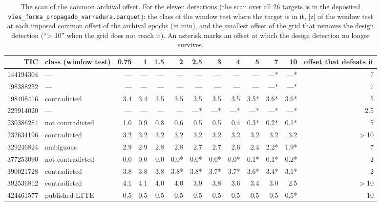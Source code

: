\documentclass{aa}
\begin{document}
\begin{table}
\caption{The scan of the common archival offset. For the eleven detections (the scan over all 26 targets is in the deposited \texttt{vies\_\allowbreak forma\_\allowbreak propagado\_\allowbreak varredura.parquet}): the class of the window test where the target is in it, |z| of the window test at each imposed common offset of the archival epochs (in min), and the smallest offset of the grid that removes the design detection (``> 10'' when the grid does not reach it). An asterisk marks an offset at which the design detection no longer survives.}
\label{t:varredura}
\centering
\scriptsize
\begin{tabular}{r l r r r r r r r r r r r}
\hline\hline
TIC & class (window test) & 0.75 & 1 & 1.5 & 2 & 2.5 & 3 & 4 & 5 & 7 & 10 & offset that defeats it\\
\hline
144194304 & --- & --- & --- & --- & --- & --- & --- & --- & --- & ---* & ---* & 7\\
198388252 & --- & --- & --- & --- & --- & --- & --- & --- & --- & ---* & ---* & 7\\
198408416 & contradicted & 3.4 & 3.4 & 3.5 & 3.5 & 3.5 & 3.5 & 3.5 & 3.5* & 3.6* & 3.6* & 5\\
229914020 & --- & --- & --- & --- & --- & ---* & ---* & ---* & ---* & ---* & ---* & 2.5\\
230386284 & not contradicted & 1.0 & 0.9 & 0.8 & 0.6 & 0.5 & 0.5 & 0.4 & 0.3* & 0.2* & 0.1* & 5\\
232634196 & contradicted & 3.2 & 3.2 & 3.2 & 3.2 & 3.2 & 3.2 & 3.2 & 3.2 & 3.2 & 3.2 & > 10\\
329246824 & ambiguous & 2.9 & 2.9 & 2.8 & 2.8 & 2.7 & 2.7 & 2.6 & 2.4 & 2.2* & 1.9* & 7\\
377253090 & not contradicted & 0.0 & 0.0 & 0.0 & 0.0* & 0.0* & 0.0* & 0.0* & 0.1* & 0.1* & 0.2* & 2\\
390021728 & contradicted & 3.8 & 3.8 & 3.8 & 3.8* & 3.8* & 3.7* & 3.7* & 3.6* & 3.4* & 3.1* & 2\\
392536812 & contradicted & 4.1 & 4.1 & 4.0 & 4.0 & 3.9 & 3.8 & 3.6 & 3.4 & 3.0 & 2.5 & > 10\\
424461577 & published LTTE & 0.5 & 0.5 & 0.5 & 0.5 & 0.5 & 0.5 & 0.5 & 0.5 & 0.5 & 0.5* & 10\\
\hline
\end{tabular}
\end{table}
\end{document}
